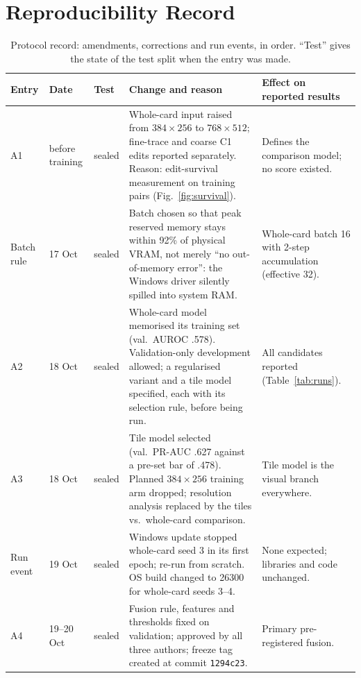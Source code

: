 \documentclass[conference]{IEEEtran}
\begin{document}
\appendices
\section{Reproducibility Record}
\label{app:repro}

\begin{table}[!t]
\caption{Protocol record: amendments, corrections and run events, in
order. ``Test'' gives the state of the test split when the entry was
made.}
\label{tab:protocol}
\centering
\scriptsize
\setlength{\tabcolsep}{3.5pt}
\renewcommand{\arraystretch}{1.12}
\begin{tabular}{@{}l l l p{} p{}@{}}
\toprule
Entry & Date & Test & Change and reason & Effect on reported results \\
\midrule
A1 & before training & sealed
  & Whole-card input raised from $384{\times}256$ to $768{\times}512$; fine-trace and coarse C1 edits reported separately. Reason: edit-survival measurement on training pairs (Fig.~\ref{fig:survival}).
  & Defines the comparison model; no score existed. \\
Batch rule & 17 Oct & sealed
  & Batch chosen so that peak reserved memory stays within 92\% of physical VRAM, not merely ``no out-of-memory error'': the Windows driver silently spilled into system RAM.
  & Whole-card batch 16 with 2-step accumulation (effective 32). \\
A2 & 18 Oct & sealed
  & Whole-card model memorised its training set (val.\ AUROC .578). Validation-only development allowed; a regularised variant and a tile model specified, each with its selection rule, before being run.
  & All candidates reported (Table~\ref{tab:runs}). \\
A3 & 18 Oct & sealed
  & Tile model selected (val.\ PR-AUC .627 against a pre-set bar of .478). Planned $384{\times}256$ training arm dropped; resolution analysis replaced by the tiles vs.\ whole-card comparison.
  & Tile model is the visual branch everywhere. \\
Run event & 19 Oct & sealed
  & Windows update stopped whole-card seed 3 in its first epoch; re-run from scratch. OS build changed to 26300 for whole-card seeds 3--4.
  & None expected; libraries and code unchanged. \\
A4 & 19--20 Oct & sealed
  & Fusion rule, features and thresholds fixed on validation; approved by all three authors; freeze tag created at commit \texttt{1294c23}.
  & Primary pre-registered fusion. \\

\end{tabular}
\end{table}
\end{document}
